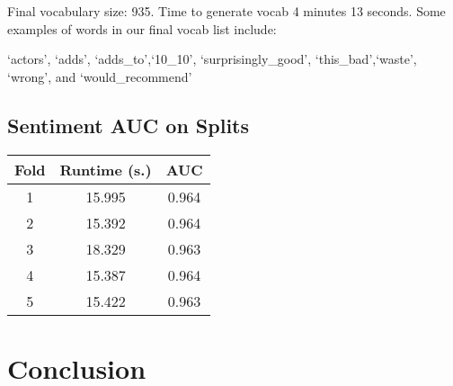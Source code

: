 \documentclass{article}
\begin{document}
Final vocabulary size: 935. Time to generate vocab 4 minutes 13 seconds. Some examples of words in our final vocab list include: 

`actors', `adds', `adds\_to',`10\_10', `surprisingly\_good', `this\_bad',`waste',
`wrong', and `would\_recommend'


\subsection{Sentiment AUC on Splits}

\begin{center}
    \begin{tabular}{|c|c|c|}
        \hline
        Fold & Runtime (s.) & AUC \\ 
        \hline \hline 
        1 & 15.995 & 0.964 \\ 
        \hline
        2 & 15.392 & 0.964 \\ 
        \hline
        3 & 18.329 & 0.963 \\ 
        \hline
        4 & 15.387 & 0.964 \\ 
        \hline
        5 & 15.422 & 0.963 \\ 
        \hline
    \end{tabular}
\end{center}

\section{Conclusion}
\end{document}
